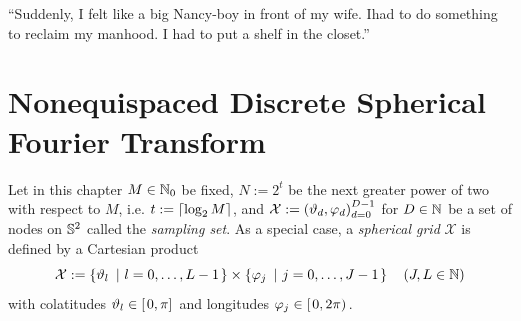 \begin{savequote}[8cm]
  ``Suddenly, I felt like a big Nancy-boy in front of my wife. Ihad to do something to reclaim my manhood. I had to put a shelf in the closet.''
\end{savequote}
\makeatletter
\chapter{Nonequispaced Discrete Spherical Fourier Transform}

\label{DSFT}
Let in this chapter $M \in \mathbb{N}_{0}$ be fixed, $N := 2^t$ be the 
next greater power of two with respect to $M$, i.e. $t := {\left\lceil\log_2 M\right\rceil}$, and $\mathcal{X} := \left(\vartheta_d,\varphi_d\right)_{d=0}^{D-1}$ for $D \in \mathbb{N}$ be
a set of nodes on $\mathbb{S}^2$ called the \emph{sampling set}. As a special case, a \emph{spherical grid} 
$\mathcal{X}$ is defined by a Cartesian product 
$$
  \mathcal{X} := \left\{\vartheta_{l}\ \left|\ l=0,\ldots,L-1\right.\right\rbrace \times \left\{\varphi_{j}\ \left|\ j=0,\ldots,J-1\right.\right\rbrace \quad \left(J,L \in \mathbb{N}\right)
$$
with colatitudes $\vartheta_{l} \in \left[\left.0,\pi\right]\right.$ and longitudes $\varphi_{j} \in \left[\left.0,2\pi\right)\right.$.

